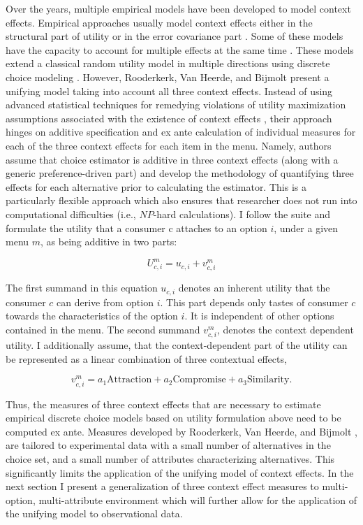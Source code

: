 \documentclass[a4paper,12pt]{article}
\newcommand{\citeyearonly}[1]{\citeyearpar{#1}}
\begin{document}
Over the years, multiple empirical models have been developed to model context effects. Empirical approaches usually model context effects either in the structural part of utility or in the error covariance part \citep{kamakuraSrivastava84, dotsonEtAl18}. Some of these models have the capacity to account for multiple effects at the same time \citep{tverskySimonson93, orhun09}. These models extend a classical random utility model \citep{mcfadden01} in multiple directions using discrete choice modeling \citep{benAkivaLerman85}. However, Rooderkerk, Van Heerde, and Bijmolt \citeyearonly{roodrkerkEtAl11} present a unifying model taking into account all three context effects. Instead of using advanced statistical techniques for remedying violations of utility maximization assumptions associated with the existence of context effects \citep{luce59}, their approach hinges on additive specification and ex ante calculation of individual measures for each of the three context effects for each item in the menu. Namely, authors assume that choice estimator is additive in three context effects (along with a generic preference-driven part) and develop the methodology of quantifying three effects for each alternative prior to calculating the estimator. This is a particularly flexible approach which also ensures that researcher does not run into computational difficulties (i.e., $NP$-hard calculations). I follow the suite and formulate the utility that a consumer c attaches to an option $i$, under a given menu $m$, as being additive in two parts:

$$U_{c,i}^m = u_{c,i} + v_{c,i}^m$$

The first summand in this equation $u_{c,i}$ denotes an inherent utility that the consumer $c$ can derive from option $i$. This part depends only tastes of consumer $c$ towards the characteristics of the option $i$. It is independent of other options contained in the menu. The second summand $v_{c,i}^m$, denotes the context dependent utility. I additionally assume, that the context-dependent part of the utility can be represented as a linear combination of three contextual effects, 

$$v_{c,i}^m = a_1 \text{Attraction} + a_2 \text{Compromise} + a_3 \text{Similarity}.
$$

Thus, the measures of three context effects that are necessary to estimate empirical discrete choice models based on utility formulation above need to be computed ex ante. Measures developed by Rooderkerk, Van Heerde, and Bijmolt \citeyearonly{roodrkerkEtAl11}, are tailored to experimental data with a small number of alternatives in the choice set, and a small number of attributes characterizing alternatives. This significantly limits the application of the unifying model of context effects. In the next section I present a generalization of three context effect measures to multi-option, multi-attribute environment which will further allow for the application of the unifying model to observational data.
\end{document}
